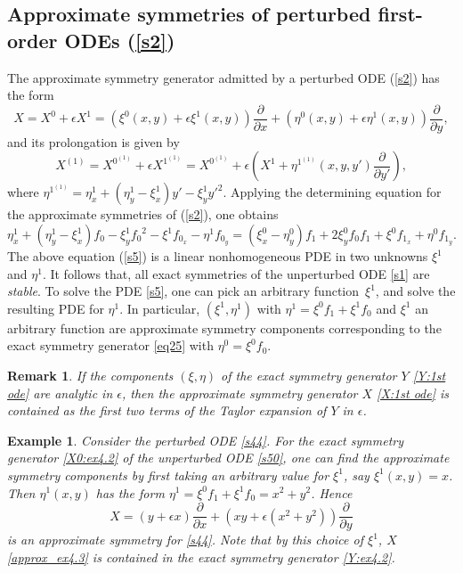 \documentclass[11pt,letter,subeqn]{article}
\newtheorem{example}{Example}[section]
\newtheorem{remark}{Remark}[section]
\begin{document}
\subsection{Approximate symmetries of perturbed first-order ODEs (\ref{s2})}
   The approximate symmetry generator admitted by a perturbed ODE (\ref{s2}) has the form
   \begin{equation}\label{X:1st ode}
      X = X^0+\epsilon X^1= \left(\xi^0(x,y)+\epsilon \xi^1(x,y)\right)\dfrac{\partial}{\partial x}+ \left(\eta^0(x,y)+\epsilon \eta^1(x,y)\right) \dfrac{\partial}{\partial y},
   \end{equation}
   and its prolongation is given by
   \begin{equation}\label{}
      X^{(1)} = X^{0^{(1)}}+\epsilon X^{1^{(1)}}= X^{0^{(1)}}+\epsilon(X^1+\eta^{1^{(1)}}(x,y,y') \dfrac{\partial}{\partial y'}),
   \end{equation}
  where $\eta^{1^{(1)}}=\eta^1_x+(\eta^1_y-\xi^1_x)y'-\xi^1_y{y'}^{2}.$ Applying the determining equation for the approximate symmetries of (\ref{s2}), one obtains
  \begin{equation}\label{s5}
     \eta^1_x+(\eta^1_y-\xi^1_x)f_0-\xi^1_y{f_0}^{2}-\xi^1f_{0_x}-\eta^1f_{0_y}=(\xi^0_x-\eta^0_y)f_1+2\xi^0_yf_0f_1+\xi^0f_{1_x}+\eta^0f_{1_y}.
  \end{equation}
  The above equation (\ref{s5}) is a linear nonhomogeneous PDE in two unknowns $\xi^1$ and $\eta^1$. It follows that, all exact symmetries of the unperturbed ODE \eqref{s1} are \textit{\textrm{stable}}. To solve the PDE \eqref{s5}, one can pick an arbitrary function \,$\xi^1$, and solve the resulting PDE for $\eta^1$. In particular, $(\xi^1,\eta^1)$ with $\eta^1=\xi^0f_1+\xi^1f_0$ and $\xi^1$ an arbitrary function are approximate symmetry components corresponding to the exact symmetry generator \eqref{eq25} with $\eta^0=\xi^0f_0$.
  \begin{remark}\label{exact_approx_1st ode_remark}
    If the components $(\xi,\eta)$ of the exact symmetry generator $Y$ \eqref{Y:1st ode} are analytic in $\epsilon$, then the approximate symmetry generator $X$ \eqref{X:1st ode} is contained as the first two terms of the Taylor expansion of $Y$ in $\epsilon$.
  \end{remark}
  \begin{example}
    Consider the perturbed ODE \eqref{s44}. For the exact symmetry generator \eqref{X0:ex4.2} of the unperturbed ODE \eqref{s50}, one can find the approximate symmetry components by first taking an arbitrary value for $\xi^1$, say $\xi^1(x,y)=x$. Then $\eta^1(x,y)$ has the form $\eta^1=\xi^0f_1+\xi^1f_0=x^2+y^2$. Hence
    \begin{equation}\label{approx_ex4.3}
      X=(y+\epsilon x)\dfrac{\partial}{\partial x}+\left (xy+\epsilon (x^2+y^2)\right) \dfrac{\partial}{\partial y}
    \end{equation}
   is an approximate symmetry for \eqref{s44}. Note that by this choice of $\xi^1$, $X$ \eqref{approx_ex4.3} is contained in the exact symmetry generator \eqref{Y:ex4.2}.
  \end{example}
\end{document}
